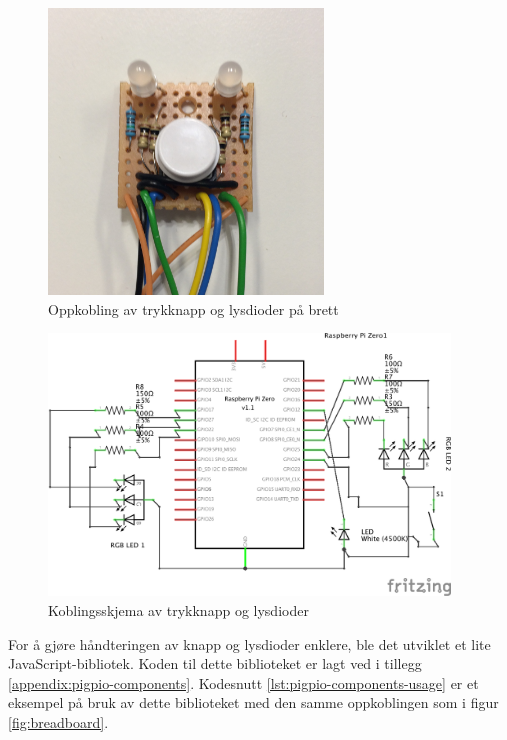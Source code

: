 \begin{figure}
\includegraphics[width=0.65\textwidth, center]{fig/prototype/ekte_knappleds}
\caption{Oppkobling av trykknapp og lysdioder på brett}
\label{fig:brett}
\end{figure}

\begin{figure}
\includegraphics[width=0.95\textwidth, center]{fig/prototype/schmeatic}
\caption{Koblingsskjema av trykknapp og lysdioder}
\label{fig:schematics}
\end{figure}

For å gjøre håndteringen av knapp og lysdioder enklere, ble det utviklet et lite JavaScript-bibliotek.
Koden til dette biblioteket er lagt ved i tillegg \ref{appendix:pigpio-components}. Kodesnutt
\ref{lst:pigpio-components-usage} er et eksempel på bruk av dette biblioteket med den samme oppkoblingen som i
figur \ref{fig:breadboard}.

